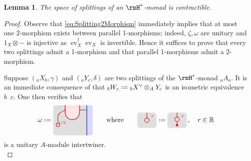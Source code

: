 \documentclass[12pt, reqno]{amsart}
\newcommand{\tikzmath}[2][]
{\vcenter{\hbox{\begin{tikzpicture}[#1]#2\end{tikzpicture}}}
}
\newcommand{\AsColor}{red}
\newcommand{\AColor}{lightgray!50}
\newcommand{\Asplitcolor}{red!10}
\newcommand{\XsColor}{red!80!black}
\newcommand{\YsColor}{blue}
\newcommand{\Bsplitcolor}{blue!15}
\DeclareMathOperator{\ev}{ev}
\theoremstyle{plain}
\newtheorem{lem}[thm]{Lemma}
\theoremstyle{definition}
\newcommand{\coloneq}{:=}
\def\coloneq{\mathrel{\vcenter{\baselineskip0.55ex\lineskiplimit0pt\hbox{\upshape.}\hbox{\upshape.}}}=}
\DeclareMathOperator{\isomeq}{\mathbin{\,\cong^\dag}}
\begin{document}
\begin{lem}\label{lem:h-star-monad-splittings-unique}
The space of splittings of an $\rmH^*$-monad is contractible.
\end{lem}
\begin{proof}
Observe that \eqref{eq:Splitting2Morphism} immediately implies that at most one 2-morphism exists between parallel 1-morphisms; indeed, $\zeta,\omega$ are unitary and $1_X\otimes -$ is injective as $\ev^\dag_X\ev_X$ is invertible.
Hence it suffices to prove that every two splittings admit a 1-morphism and that parallel 1-morphisms admit a 2-morphism.
\\ 

\item[\underline{$\exists$ 1-morphism:}]
Suppose $({}_aX_b,\gamma)$ and $({}_aY_c,\delta)$ are two splittings of the $\rmH^*$-monad ${}_aA_a$. It is an immediate consequence of \cite[Remarks 4.12, 4.40]{MR5078555} that ${}_bW_c\coloneq{}_bX^\vee\otimes_AY_c$ is an isometric equivalence $b \isomeq c$. One then verifies that 
\[
    \omega\coloneq
    \tikzmath{
        \def\tkzxstep{0}
        \def\tkzlbord{-1.4}
        \tikzset{scale=1.25}
        \clip[rounded corners] (\tkzlbord,1) rectangle (.25,-0.25);
        \fill[\AColor] (\tkzlbord,1) rectangle (\tkzxstep,-0.25);
        \fill[\Bsplitcolor] (\tkzxstep,1) rectangle (0.25,-0.25);
        \draw[thick,\YsColor] (\tkzxstep,-.25) -- (\tkzxstep,1);
        \filldraw[thick, \XsColor, fill=\Asplitcolor] (-.3,1) --(-.3,.7) arc(0:-180:.3cm) --(-.9,1);
        \draw[\AsColor,thick](-.9,.8) to[out=210,in=90] (-1.2,.5) -- ++(0,-.25) arc(90:450:2pt) node[above right, red, xshift=-1mm, yshift=-2mm]{$\scriptscriptstyle 1/2$};
        \draw[\AsColor,thick](-.3,.8)--(0,.8);
    }
    \qquad\text{where}\qquad
    \tikzmath{
        \tikzset{scale=0.2}
        \coordinate (O) at (0,0);
        \fill[\AColor,rounded corners] (-1,0) rectangle ++(5,4);
        \draw[\AsColor,thick] (O) ++(1.5,2.575) -- ++(0,1.425);
        \draw[thick,fill=\AColor, draw=\AsColor](O)++(1.5,2) circle(0.575);
        \node[red](r) at (3,3){$\scriptstyle r$};
    }\coloneq    
    \tikzmath{
        \tikzset{scale=0.2}
        \coordinate (O) at (0,0);
        \fill[\AColor,rounded corners] (-1,0) rectangle ++(5,4);
        \draw[\AsColor,thick] (O) ++(1.5,.75) -- ++(0,0.925);
        \draw[\AsColor,thick] (O) ++(1.5,2.825) -- ++(0,1.175);
        \draw[thick,fill=\AColor, draw=\AsColor](O)++(1.5,2.25) circle(0.575);
        \node[red](r) at (3,3){$\scriptstyle r$};
        \fill[red](1.5,.75)circle(0.3cm);
    }\,,\quad
    r\in\mathbb{R}
\]
is a unitary $A$-module intertwiner.
\\


\end{proof}
\end{document}
